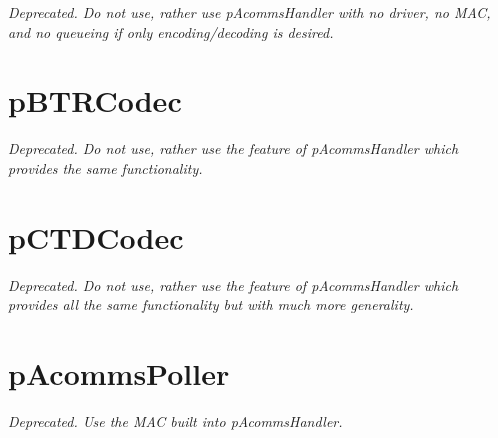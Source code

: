 \textit{Deprecated. Do not use, rather use pAcommsHandler with no driver, no MAC, and no queueing if only encoding/decoding is desired.}

\section{pBTRCodec}

\textit{Deprecated. Do not use, rather use the  feature of pAcommsHandler which provides the same functionality.}

\section{pCTDCodec}

\textit{Deprecated. Do not use, rather use the  feature of pAcommsHandler which provides all the same functionality but with much more generality. }

\section{pAcommsPoller}

\textit{Deprecated. Use the MAC built into pAcommsHandler. }

\DeleteShortVerb{\!}

